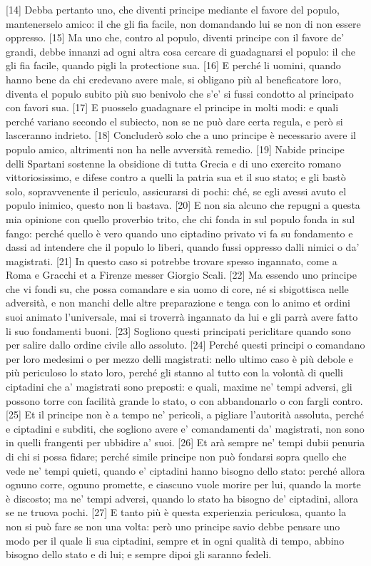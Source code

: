 {[}14{]} Debba pertanto uno, che diventi principe mediante el favore del
populo, mantenerselo amico: il che gli fia facile, non domandando lui se
non di non essere oppresso. {[}15{]} Ma uno che, contro al populo,
diventi principe con il favore de' grandi, debbe innanzi ad ogni altra
cosa cercare di guadagnarsi el populo: il che gli fia facile, quando
pigli la protectione sua. {[}16{]} E perché li uomini, quando hanno bene
da chi credevano avere male, si obligano più al beneficatore loro,
diventa el populo subito più suo benivolo che s'e' si fussi condotto al
principato con favori sua. {[}17{]} E puosselo guadagnare el principe in
molti modi: e quali perché variano secondo el subiecto, non se ne può
dare certa regula, e però si lasceranno indrieto. {[}18{]} Concluderò
solo che a uno principe è necessario avere il populo amico, altrimenti
non ha nelle avversità remedio. {[}19{]} Nabide principe delli Spartani
sostenne la obsidione di tutta Grecia e di uno exercito romano
vittoriosissimo, e difese contro a quelli la patria sua et il suo stato;
e gli bastò solo, sopravvenente il periculo, assicurarsi di pochi: ché,
se egli avessi avuto el populo inimico, questo non li bastava. {[}20{]}
E non sia alcuno che repugni a questa mia opinione con quello proverbio
trito, che chi fonda in sul populo fonda in sul fango: perché quello è
vero quando uno ciptadino privato vi fa su fondamento e dassi ad
intendere che il populo lo liberi, quando fussi oppresso dalli nimici o
da' magistrati. {[}21{]} In questo caso si potrebbe trovare spesso
ingannato, come a Roma e Gracchi et a Firenze messer Giorgio Scali.
{[}22{]} Ma essendo uno principe che vi fondi su, che possa comandare e
sia uomo di core, né si sbigottisca nelle adversità, e non manchi delle
altre preparazione e tenga con lo animo et ordini suoi animato
l'universale, mai si troverrà ingannato da lui e gli parrà avere fatto
li suo fondamenti buoni. {[}23{]} Sogliono questi principati periclitare
quando sono per salire dallo ordine civile allo assoluto. {[}24{]}
Perché questi principi o comandano per loro medesimi o per mezzo delli
magistrati: nello ultimo caso è più debole e più periculoso lo stato
loro, perché gli stanno al tutto con la volontà di quelli ciptadini che
a' magistrati sono preposti: e quali, maxime ne' tempi adversi, gli
possono torre con facilità grande lo stato, o con abbandonarlo o con
fargli contro. {[}25{]} Et il principe non è a tempo ne' pericoli, a
pigliare l'autorità assoluta, perché e ciptadini e subditi, che sogliono
avere e' comandamenti da' magistrati, non sono in quelli frangenti per
ubbidire a' suoi. {[}26{]} Et arà sempre ne' tempi dubii penuria di chi
si possa fidare; perché simile principe non può fondarsi sopra quello
che vede ne' tempi quieti, quando e' ciptadini hanno bisogno dello
stato: perché allora ognuno corre, ognuno promette, e ciascuno vuole
morire per lui, quando la morte è discosto; ma ne' tempi adversi, quando
lo stato ha bisogno de' ciptadini, allora se ne truova pochi. {[}27{]} E
tanto più è questa experienzia periculosa, quanto la non si può fare se
non una volta: però uno principe savio debbe pensare uno modo per il
quale li sua ciptadini, sempre et in ogni qualità di tempo, abbino
bisogno dello stato e di lui; e sempre dipoi gli saranno fedeli.

